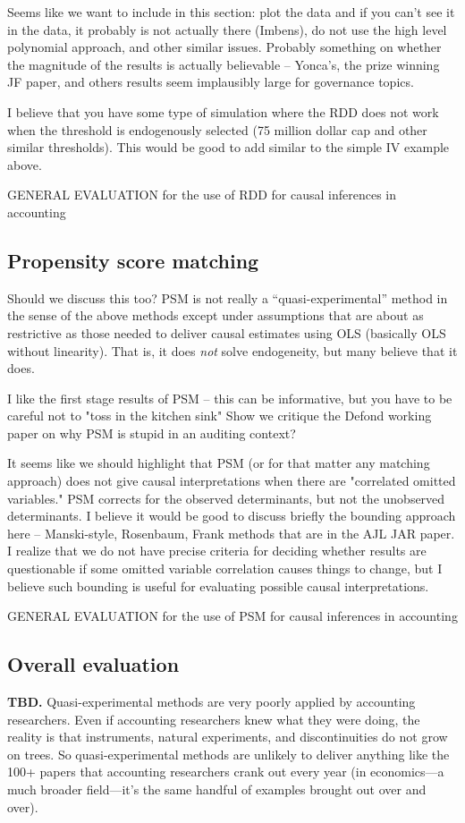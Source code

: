 \documentclass[11pt]{amsart}
\begin{document}
Seems like we want to include in this section:  plot the data and if you can't see it in the data, it probably is not actually there (Imbens), do not use the high level polynomial approach, and other similar issues.  Probably something on whether the magnitude of the results is actually believable -- Yonca's, the prize winning JF paper, and others results seem implausibly large for governance topics.


I believe that you have some type of simulation where the RDD does not work when the threshold is endogenously selected (75 million dollar cap and other similar thresholds).  This would be good to add similar to the simple IV example above.

GENERAL EVALUATION for the use of RDD for causal inferences in accounting 


\subsection{Propensity score matching}

Should we discuss this too? PSM is not really a ``quasi-experimental'' method in the sense of the above methods except under assumptions that are about as restrictive as those needed to deliver causal estimates using OLS (basically OLS without linearity). That is, it does \emph{not} solve endogeneity, but many believe that it does.

I like the first stage results of PSM -- this can be informative, but you have to be careful not to "toss in the kitchen sink"  Show we critique the Defond working paper on why PSM is stupid in an auditing context?

It seems like we should highlight that PSM (or for that matter any matching approach) does not give causal interpretations when there are "correlated omitted variables."  PSM corrects for the observed determinants, but not the unobserved determinants.  I believe it would be good to discuss briefly the bounding approach here -- Manski-style, Rosenbaum, Frank methods that are in the AJL JAR paper.  I realize that we do not have precise criteria for deciding whether results are questionable if some omitted variable correlation causes things to change, but I believe such bounding is useful for evaluating possible causal interpretations.


GENERAL EVALUATION for the use of PSM for causal inferences in accounting 


\subsection{Overall evaluation} 
\textbf{TBD.} Quasi-experimental methods are very poorly applied by accounting researchers. Even if accounting researchers knew what they were doing, the reality is that instruments, natural experiments, and discontinuities do not grow on trees. So quasi-experimental methods are unlikely to deliver anything like the 100+ papers that accounting researchers crank out every year (in economics---a much broader field---it's the same handful of examples brought out over and over).
\end{document}
